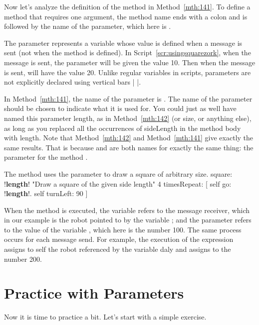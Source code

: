 \documentclass[a4paper,10pt,twoside]{book}
\begin{document}
Now let’s analyze the definition of the method  in Method~\ref{mth:141}. To define a 
method that requires one argument, the method name ends with a colon and is followed by 
the name of the parameter, which here is . 

The parameter represents a variable whose value is defined when a message is sent (not 
when the method is defined). In Script~\ref{scr:usingsquarezork}, when the message 
 is sent, the parameter  will be given the value 10. Then when the message  is sent,  will have the value 20. Unlike regular variables in scripts, parameters are not explicitly declared 
using vertical bars | |. 

In Method~\ref{mth:141}, the name of the parameter is . The name of the parameter 
should be chosen to indicate what it is used for. You could just as well have named this parameter 
length, as in Method~\ref{mth:142} (or size, or anything else), as long as you replaced all the occurrences 
of sideLength in the method body with length. Note that Method~\ref{mth:142} and Method~\ref{mth:141} give 
exactly the same results. That is because  and  are both names for exactly the 
same thing: the parameter for the method . 

\begin{method}[142]{The method  uses the parameter  to draw a square of arbitrary size.}
square: !\textbf{length}!
   "Draw a square of the given side length" 
   4 timesRepeat: 
      [ self go: !\textbf{length}!. 
      self turnLeft: 90 ] 
\end{method}


When the method  is executed, the variable \self refers to the message receiver, 
which in our example is the robot pointed to by the variable ; and the parameter 
refers to the value of the variable , which here is the number 100. The same process occurs 
for each message send. For example, the execution of the expression  assigns 
to self the robot referenced by the variable daly and assigns to  the number 200. 



\section{Practice with Parameters }
Now it is time to practice a bit. Let’s start with a simple exercise. 
\end{document}
